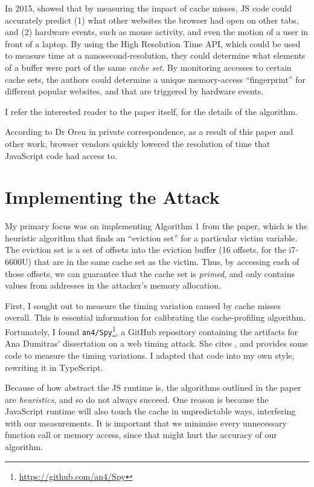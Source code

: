 \documentclass[a4paper,10pt,twocolumn]{article}
\theoremstyle{definition}
\newcommand*{\code}{\texttt}
\begin{document}
In 2015, \textcite{Oren_KSK_2015} showed that by measuring the impact of cache
misses, JS code could accurately predict (1) what other websites the
browser had open on other tabs, and (2) hardware events, such as mouse activity,
and even the motion of a user in front of a laptop.
By using the High Resolution Time API, which could be used to measure time at a
nanosecond-resolution, they could determine what elements of a buffer were part
of the same \emph{cache set}.
By monitoring accesses to certain cache sets, the authors could determine a
unique memory-access ``fingerprint'' for different popular websites, and that
are triggered by hardware events.

I refer the interested reader to the paper itself, for the details of the
algorithm.

According to Dr Oren in private correspondence, as a result of this paper and
other work, browser vendors quickly lowered the resolution of time that
JavaScript code had access to.



\section{Implementing the Attack}

My primary focus was on implementing Algorithm 1 from the paper, which is the
heuristic algorithm that finds an ``eviction set'' for a particular victim variable.
The eviction set is a set of offsets into the eviction buffer (16 offsets, for
the i7-6600U) that are in the same cache set as the victim.
Thus, by accessing each of those offsets, we can guarantee that the cache set is
\emph{primed}, and only contains values from addresses in the attacker's memory
allocation.

First, I sought out to measure the timing variation caused by cache misses
overall.
This is essential information for calibrating the cache-profiling algorithm.
Fortunately, I found \code{an4/Spy}\footnote{\url{https://github.com/an4/Spy}},
a GitHub repository containing the artifacts for Ana Dumitras' dissertation on a
web timing attack.
She cites \textcite{Oren_KSK_2015}, and provides some code to measure the timing
variations.
I adapted that code into my own style, rewriting it in TypeScript.

Because of how abstract the JS runtime is, the algorithms outlined in
the paper are \emph{heuristics}, and so do not always succeed.
One reason is because the JavaScript runtime will also
touch the cache in unpredictable ways, interfering with our measurements.
It is important that we minimise every unnecessary function call or memory
access, since that might hurt the accuracy of our algorithm.
\end{document}
